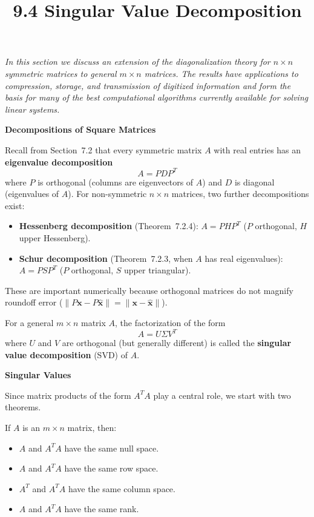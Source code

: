 \documentclass{article}
\title{9.4 Singular Value Decomposition}
\date{}
\author{}
\newcommand{\redheading}[1]{{\vspace{2mm}\noindent\Large\bfseries\color{red!55!black} #1\par}\vspace{2mm}}
\begin{document}
\maketitle

{\itshape\color{blue!45!black}
In this section we discuss an extension of the diagonalization theory for $n\times n$
symmetric matrices to general $m\times n$ matrices. The results have applications to
compression, storage, and transmission of digitized information and form the basis for
many of the best computational algorithms currently available for solving linear
systems.\par}

\vspace{2mm}

\redheading{Decompositions of Square Matrices}

Recall from Section~7.2 that every symmetric matrix $A$ with real entries has an
\textbf{eigenvalue decomposition}
\[
  A = PDP^T \tag{1}
\]
where $P$ is orthogonal (columns are eigenvectors of $A$) and $D$ is diagonal
(eigenvalues of $A$). For non-symmetric $n\times n$ matrices, two further
decompositions exist:
\begin{itemize}
  \item \textbf{Hessenberg decomposition} (Theorem~7.2.4): $A = PHP^T$ ($P$ orthogonal,
        $H$ upper Hessenberg).
  \item \textbf{Schur decomposition} (Theorem~7.2.3, when $A$ has real eigenvalues):
        $A = PSP^T$ ($P$ orthogonal, $S$ upper triangular).
\end{itemize}
These are important numerically because orthogonal matrices do not magnify roundoff
error ($\|P\mathbf{x} - P\hat{\mathbf{x}}\| = \|\mathbf{x}-\hat{\mathbf{x}}\|$).

For a general $m\times n$ matrix $A$, the factorization of the form
\[
  A = U\Sigma V^T
\]
where $U$ and $V$ are orthogonal (but generally different) is called the
\textbf{singular value decomposition} (SVD) of $A$.

\vspace{2mm}
\redheading{Singular Values}

Since matrix products of the form $A^TA$ play a central role, we start with two theorems.

\begin{tcolorbox}[colback=red!4, colframe=red!60!black,
  title={\textbf{Theorem 9.4.1}}, boxrule=0.5mm, arc=3mm]
If $A$ is an $m\times n$ matrix, then:
\begin{itemize}
  \item[(a)] $A$ and $A^TA$ have the same null space.
  \item[(b)] $A$ and $A^TA$ have the same row space.
  \item[(c)] $A^T$ and $A^TA$ have the same column space.
  \item[(d)] $A$ and $A^TA$ have the same rank.
\end{itemize}
\end{tcolorbox}
\end{document}
